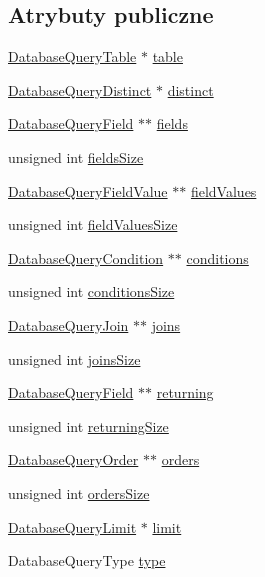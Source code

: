 \subsection*{Atrybuty publiczne}
\begin{DoxyCompactItemize}
\item 
\hyperlink{structsDatabaseQueryTable}{Database\+Query\+Table} $\ast$ \hyperlink{structsDatabaseQuery_a8d34ce4ad0e31c1bc8978ec03d4b5fbf}{table}
\item 
\hyperlink{structsDatabaseQueryDistinct}{Database\+Query\+Distinct} $\ast$ \hyperlink{structsDatabaseQuery_af873390ab854ce4a34f704971d271521}{distinct}
\item 
\hyperlink{structsDatabaseQueryField}{Database\+Query\+Field} $\ast$$\ast$ \hyperlink{structsDatabaseQuery_a2075e002e2ecbf166d9fbcc6f9780701}{fields}
\item 
unsigned int \hyperlink{structsDatabaseQuery_a052737bce106f2758ba5d5ac663ff57a}{fields\+Size}
\item 
\hyperlink{structsDatabaseQueryCondition}{Database\+Query\+Field\+Value} $\ast$$\ast$ \hyperlink{structsDatabaseQuery_a7bf7cf5cda36b6c6d3701926c35d8972}{field\+Values}
\item 
unsigned int \hyperlink{structsDatabaseQuery_aa203f0cb4e33b39d48e6674250d9f74d}{field\+Values\+Size}
\item 
\hyperlink{structsDatabaseQueryCondition}{Database\+Query\+Condition} $\ast$$\ast$ \hyperlink{structsDatabaseQuery_a54e52c15ffef2b87e3b2c7a4d0ffc2f9}{conditions}
\item 
unsigned int \hyperlink{structsDatabaseQuery_a7534216a1d5ad726447b73b6eb4fdbc4}{conditions\+Size}
\item 
\hyperlink{structsDatabaseQueryJoin}{Database\+Query\+Join} $\ast$$\ast$ \hyperlink{structsDatabaseQuery_aa66192f20c6390fd1bd5f2db96860926}{joins}
\item 
unsigned int \hyperlink{structsDatabaseQuery_aca409db9b76aea5d1e83390e2a251fd3}{joins\+Size}
\item 
\hyperlink{structsDatabaseQueryField}{Database\+Query\+Field} $\ast$$\ast$ \hyperlink{structsDatabaseQuery_ad88d21177dbe929109914b4b75665454}{returning}
\item 
unsigned int \hyperlink{structsDatabaseQuery_a08dafb08cb00fac230eaceb0dfd20c9f}{returning\+Size}
\item 
\hyperlink{structsDatabaseQueryOrder}{Database\+Query\+Order} $\ast$$\ast$ \hyperlink{structsDatabaseQuery_a4f2d3a55d0e7fcd151f7650c08ff7975}{orders}
\item 
unsigned int \hyperlink{structsDatabaseQuery_aecb5648962f556532a3a2c91b4970397}{orders\+Size}
\item 
\hyperlink{structsDatabaseQueryLimit}{Database\+Query\+Limit} $\ast$ \hyperlink{structsDatabaseQuery_aeca8178bae8fc02faae2bf64d6e7455a}{limit}
\item 
Database\+Query\+Type \hyperlink{structsDatabaseQuery_a5b7daf6543a0c36ab9b6a2a948f953bb}{type}
\end{DoxyCompactItemize}


